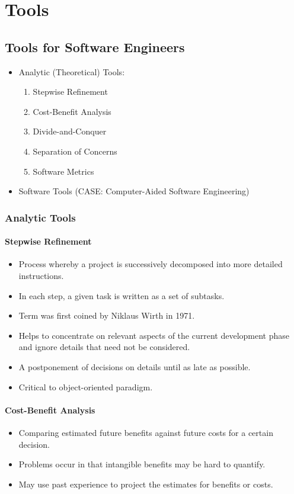 \documentclass{report}
\begin{document}
	\chapter{Tools}
		\section{Tools for Software Engineers} 
			\begin{itemize}
				\item  Analytic (Theoretical) Tools:
					\begin{enumerate}
						\item  Stepwise Refinement
						\item Cost-Benefit Analysis
						\item Divide-and-Conquer
						\item Separation of Concerns
						\item Software Metrics
					\end{enumerate}
				\item Software Tools (CASE: Computer-Aided Software Engineering)
			\end{itemize}
			\subsection{Analytic Tools}
				\subsubsection{Stepwise Refinement}
					\begin{itemize}
						\item Process whereby a project is successively decomposed into more detailed instructions.
						\item In each step, a given task is written as a set of subtasks.
						\item Term was first coined by Niklaus Wirth in 1971.
						\item Helps to concentrate on relevant aspects of the current development phase and ignore details that need not be considered.
						\item A postponement of decisions on details until as late as possible.
						\item Critical to object-oriented paradigm.
					\end{itemize}
				\subsubsection{Cost-Benefit Analysis}
					\begin{itemize}
						\item Comparing estimated future benefits against future costs for a certain decision.
						\item Problems occur in that intangible benefits may be hard to quantify.
						\item May use past experience to project the estimates for benefits or costs.
					\end{itemize}
\end{document}
